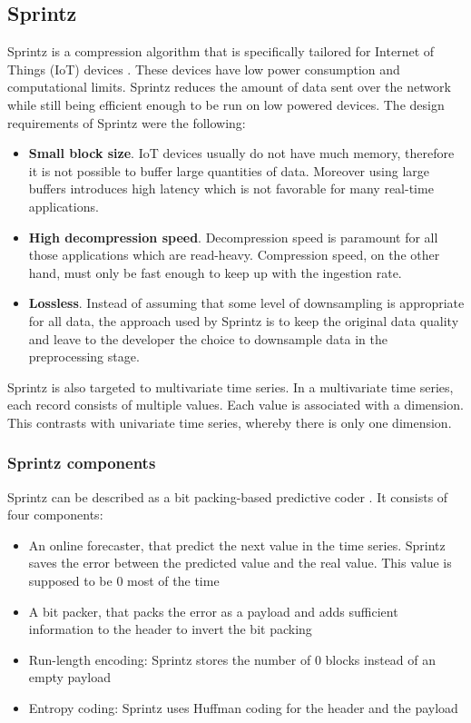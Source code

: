 \subsection{Sprintz}
Sprintz is a compression algorithm that is specifically tailored for Internet of Things (IoT)
devices \cite{blalock2018sprintz}. These devices have low power consumption and computational limits. Sprintz
reduces the amount of data sent over the network while still being efficient enough to be
run on low powered devices. The design requirements of Sprintz were the following:
\begin{itemize}
    \item \textbf{Small block size}. IoT devices usually do not have much memory, therefore it is not
    possible to buffer large quantities of data. Moreover using large buffers introduces high
    latency which is not favorable for many real-time applications.

    \item \textbf{High decompression speed}. Decompression speed is paramount for all those applications
    which are read-heavy. Compression speed, on the other hand, must only be fast enough to
    keep up with the ingestion rate.
    
    \item \textbf{Lossless}. Instead of assuming that some level of downsampling is appropriate for
    all data, the approach used by Sprintz is to keep the original data quality and leave to
    the developer the choice to downsample data in the preprocessing stage.
\end{itemize}
Sprintz is also targeted to multivariate time series. In a multivariate time series,
each record consists of multiple values. Each value is associated with a dimension. This
contrasts with univariate time series, whereby there is only one dimension.

\subsubsection{Sprintz components}
Sprintz can be described as a bit packing-based predictive coder \cite{blalock2018sprintz}.
It consists of four components:
\begin{itemize}
    \item An online forecaster, that predict the next value in the time series. Sprintz
    saves the error between the predicted value and the real value. This value is supposed
    to be 0 most of the time
    \item A bit packer, that packs the error as a payload and adds sufficient information
    to the header to invert the bit packing
    \item Run-length encoding: Sprintz stores the number of 0 blocks instead of an empty
    payload
    \item Entropy coding: Sprintz uses Huffman coding for the header and the payload
\end{itemize}

